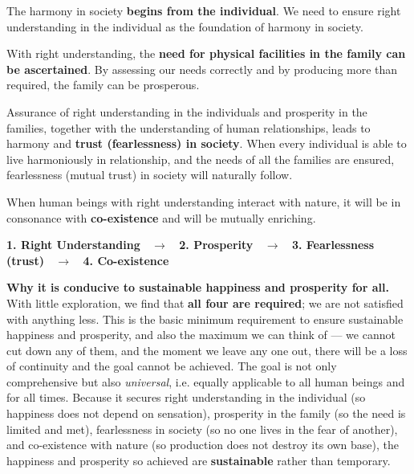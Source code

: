\begin{apts}
\item The harmony in society \textbf{begins from the individual}. We need to
      ensure right understanding in the individual as the foundation of
      harmony in society.
\item With right understanding, the \textbf{need for physical facilities in
      the family can be ascertained}. By assessing our needs correctly and by
      producing more than required, the family can be prosperous.
\item Assurance of right understanding in the individuals and prosperity in
      the families, together with the understanding of human relationships,
      leads to harmony and \textbf{trust (fearlessness) in society}. When
      every individual is able to live harmoniously in relationship, and the
      needs of all the families are ensured, fearlessness (mutual trust) in
      society will naturally follow.
\item When human beings with right understanding interact with nature, it will
      be in consonance with \textbf{co-existence} and will be mutually
      enriching.
\end{apts}

\begin{keybox}
\textbf{1. Right Understanding \ $\rightarrow$ \ 2. Prosperity \ $\rightarrow$
\ 3. Fearlessness (trust) \ $\rightarrow$ \ 4. Co-existence}
\end{keybox}

\textbf{Why it is conducive to sustainable happiness and prosperity for all.}
With little exploration, we find that \textbf{all four are required}; we are
not satisfied with anything less. This is the basic minimum requirement to
ensure sustainable happiness and prosperity, and also the maximum we can think
of --- we cannot cut down any of them, and the moment we leave any one out,
there will be a loss of continuity and the goal cannot be achieved. The goal
is not only comprehensive but also \emph{universal}, i.e. equally applicable to
all human beings and for all times. Because it secures right understanding in
the individual (so happiness does not depend on sensation), prosperity in the
family (so the need is limited and met), fearlessness in society (so no one
lives in the fear of another), and co-existence with nature (so production
does not destroy its own base), the happiness and prosperity so achieved are
\textbf{sustainable} rather than temporary.


